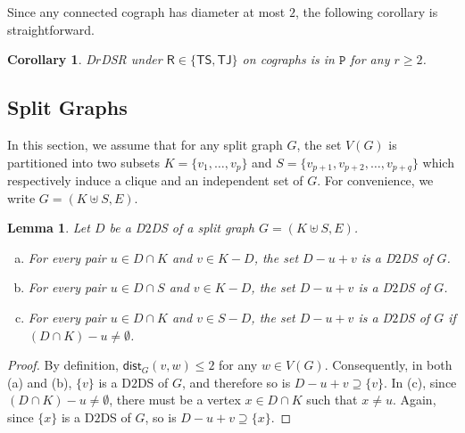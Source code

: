 \documentclass[a4paper]{article}
\theoremstyle{plain}
\newtheorem{corollary}[theorem]{Corollary}
\newtheorem{lemma}[theorem]{Lemma}
\theoremstyle{definition}
\newcommand{\sfTS}{{\mathsf{TS}}} %
\newcommand{\sfTJ}{{\mathsf{TJ}}} %
\newcommand{\sfR}{{\mathsf{R}}} %
\newcommand{\ttP}{{\mathtt{P}}}
\newcommand{\dist}{\mathsf{dist}} %
\begin{document}
Since any connected cograph has diameter at most $2$, the following corollary is straightforward.
\begin{corollary}\label{cor:TJ-cograph}
	\textsc{D$r$DSR} under $\sfR \in \{\sfTS, \sfTJ\}$ on cographs is in $\ttP$ for any $r \geq 2$.
\end{corollary}

\subsection{Split Graphs}
\label{sec:split}

In this section, we assume that for any split graph $G$, the set $V(G)$ is partitioned into two subsets $K = \{v_1, \dots, v_p\}$ and $S = \{v_{p+1}, v_{p+2}, \dots, v_{p+q}\}$ which respectively induce a clique and an independent set of $G$.
For convenience, we write $G = (K \uplus S, E)$.

\begin{lemma}\label{lem:TS-split}
	Let $D$ be a D$2$DS of a split graph $G = (K \uplus S, E)$.
	\begin{enumerate}[(a)]
		\item For every pair $u \in D \cap K$ and $v \in K - D$, the set $D - u + v$ is a D$2$DS of $G$.
		\item For every pair $u \in D \cap S$ and $v \in K - D$, the set $D - u + v$ is a D$2$DS of $G$.
		\item For every pair $u \in D \cap K$ and $v \in S - D$, the set $D - u + v$ is a D$2$DS of $G$ if $(D \cap K) - u \neq \emptyset$.
	\end{enumerate}
\end{lemma}
\begin{proof}
	By definition, $\dist_G(v, w) \leq 2$ for any $w \in V(G)$.
	Consequently, in both (a) and (b), $\{v\}$ is a D$2$DS of $G$, and therefore so is $D - u + v \supseteq \{v\}$.
	In (c), since $(D \cap K) - u \neq \emptyset$, there must be a vertex $x \in D \cap K$ such that $x \neq u$.
	Again, since $\{x\}$ is a D$2$DS of $G$, so is $D - u + v \supseteq \{x\}$.
\end{proof}
\end{document}
